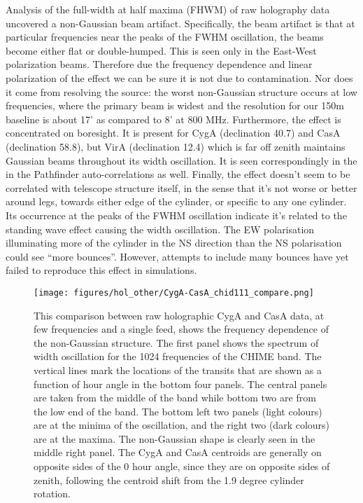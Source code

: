Analysis of the full-width at half maxima (FHWM) of raw holography data uncovered a non-Gaussian beam artifact. Specifically, the beam artifact is that at particular frequencies near the peaks of the FWHM oscillation, the beams become either flat or double-humped. This is seen only in the East-West polarization beams. Therefore due the frequency dependence and linear polarization of the effect we can be sure it is not due to contamination. Nor does it come from resolving the source: the worst non-Gaussian structure occurs at low frequencies, where the primary beam is widest and the resolution for our 150m baseline is about 17' as compared to 8' at 800 MHz. Furthermore, the effect  is concentrated on boresight. It is present for CygA (declination 40.7) and CasA (declination 58.8), but VirA (declination 12.4) which is far off zenith maintains Gaussian beams throughout its width oscillation. It is seen correspondingly in the in the Pathfinder auto-correlations as well. Finally, the effect doesn't seem to be correlated with telescope structure itself, in the sense that it's not worse or better around legs, towards either edge of the cylinder, or specific to any one cylinder. Its occurrence at the peaks of the FWHM oscillation indicate it's related to the standing wave effect causing the width oscillation. The EW polarisation illuminating more of the cylinder in the NS direction than the NS polarisation could see ``more bounces''. However, attempts to include many bounces have yet failed to reproduce this effect in simulations.

\begin{figure}[h!]
\texttt{[image: figures/hol\_other/CygA-CasA\_chid111\_compare.png]}
\caption{This comparison between raw holographic CygA and CasA data, at few frequencies and a single feed, shows the frequency dependence of the non-Gaussian structure. The first panel shows the spectrum of width oscillation for the 1024 frequencies of the CHIME band. The vertical lines mark the locations of the transits that are shown as a function of hour angle in the bottom four panels. The central panels are taken from the middle of the band while bottom two are from the low end of the band. The bottom left two panels (light colours) are at the minima of the oscillation, and the right two (dark colours) are at the maxima. The non-Gaussian shape is clearly seen in the middle right panel. The CygA and CasA centroids are generally on opposite sides of the 0 hour angle, since they are on opposite sides of zenith, following the centroid shift from the 1.9 degree cylinder rotation.}
\label{cygacasa}
\end{figure} 

